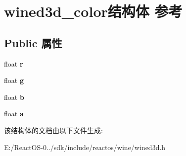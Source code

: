 \hypertarget{structwined3d__color}{}\section{wined3d\+\_\+color结构体 参考}
\label{structwined3d__color}
\subsection*{Public 属性}
\begin{DoxyCompactItemize}
\item 
\mbox{\label{structwined3d__color_a89216b019191bbed79e09912af5a5f10}} 
float {\bfseries r}
\item 
\mbox{\label{structwined3d__color_acf849be8a2d8b98b676773ce00289a66}} 
float {\bfseries g}
\item 
\mbox{\label{structwined3d__color_afbddd3a27ba2f4d7b155c6747dd73b29}} 
float {\bfseries b}
\item 
\mbox{\label{structwined3d__color_ae27af11db3de23cf04e95103b7ce8d1e}} 
float {\bfseries a}
\end{DoxyCompactItemize}


该结构体的文档由以下文件生成\+:\begin{DoxyCompactItemize}
\item 
E\+:/\+React\+O\+S-\/0../sdk/include/reactos/wine/wined3d.\+h\end{DoxyCompactItemize}
